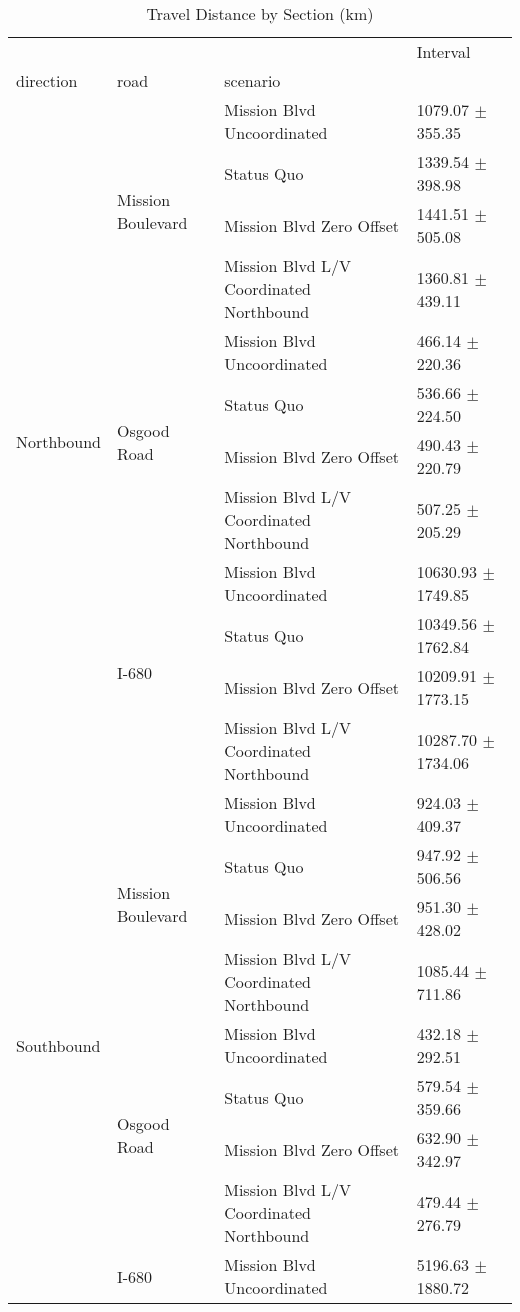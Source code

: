 \begin{table}
\caption{Travel Distance by Section (km)}
\begin{tabular}{llll}
\toprule
 &  &  & Interval \\
direction & road & scenario &  \\
\midrule
\multirow[t]{12}{*}{Northbound} & \multirow[t]{4}{*}{Mission Boulevard} & Mission Blvd Uncoordinated & 1079.07 $\pm$ 355.35 \\
 &  & Status Quo & 1339.54 $\pm$ 398.98 \\
 &  & Mission Blvd Zero Offset & 1441.51 $\pm$ 505.08 \\
 &  & Mission Blvd L/V Coordinated Northbound & 1360.81 $\pm$ 439.11 \\
 & \multirow[t]{4}{*}{Osgood Road} & Mission Blvd Uncoordinated & 466.14 $\pm$ 220.36 \\
 &  & Status Quo & 536.66 $\pm$ 224.50 \\
 &  & Mission Blvd Zero Offset & 490.43 $\pm$ 220.79 \\
 &  & Mission Blvd L/V Coordinated Northbound & 507.25 $\pm$ 205.29 \\
 & \multirow[t]{4}{*}{I-680} & Mission Blvd Uncoordinated & 10630.93 $\pm$ 1749.85 \\
 &  & Status Quo & 10349.56 $\pm$ 1762.84 \\
 &  & Mission Blvd Zero Offset & 10209.91 $\pm$ 1773.15 \\
 &  & Mission Blvd L/V Coordinated Northbound & 10287.70 $\pm$ 1734.06 \\
\multirow[t]{12}{*}{Southbound} & \multirow[t]{4}{*}{Mission Boulevard} & Mission Blvd Uncoordinated & 924.03 $\pm$ 409.37 \\
 &  & Status Quo & 947.92 $\pm$ 506.56 \\
 &  & Mission Blvd Zero Offset & 951.30 $\pm$ 428.02 \\
 &  & Mission Blvd L/V Coordinated Northbound & 1085.44 $\pm$ 711.86 \\
 & \multirow[t]{4}{*}{Osgood Road} & Mission Blvd Uncoordinated & 432.18 $\pm$ 292.51 \\
 &  & Status Quo & 579.54 $\pm$ 359.66 \\
 &  & Mission Blvd Zero Offset & 632.90 $\pm$ 342.97 \\
 &  & Mission Blvd L/V Coordinated Northbound & 479.44 $\pm$ 276.79 \\
 & \multirow[t]{4}{*}{I-680} & Mission Blvd Uncoordinated & 5196.63 $\pm$ 1880.72 \\

\end{tabular}
\end{table}
